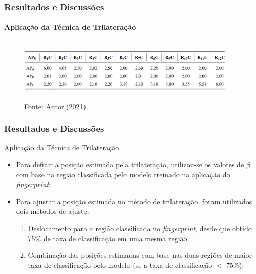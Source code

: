 \documentclass[xcolor={dvipsnames,svgnames,table}]{beamer}
\begin{document}
	\begin{frame}
		\frametitle{Resultados e Discussões}
		\framesubtitle{Aplicação da Técnica de Trilateração}
		\begin{figure}
			\caption*{Tabela 3: Valores do fator de perda de percurso ($\beta$) em cada centro de região para cada AP}
			\vspace{-5pt}
			\centering
			\includegraphics[width=10.5cm, height=3cm]{imgs/betas.PNG}
			\vspace{-5pt}
			\caption*{\tiny{Fonte: Autor (2021).}}
		\end{figure}
	\end{frame}

	\begin{frame}
		\frametitle{Resultados e Discussões}
		\begin{block}{Aplicação da Técnica de Trilateração}
			\begin{itemize}[label=\textcolor{black}{\textbullet}, left=5pt]
				\justifying
				\item Para definir a posição estimada pela trilateração, utilizou-se os valores de $\beta$ com base na região classificada pelo modelo treinado na aplicação do \textit{fingerprint};
				\item Para ajustar a posição estimada no método de trilateração, foram utilizados dois métodos de ajuste:
				\begin{enumerate}[label=\arabic*.]
					\item Deslocamento para a região classificada no \textit{fingerprint}, desde que obtido 75\% de taxa de classificação em uma mesma região;
					\item Combinação das posições estimadas com base nas duas regiões de maior taxa de classificação pelo modelo (se a taxa de classificação $<$ 75\%);%
				\end{enumerate}
			\end{itemize}
		\end{block}
	\end{frame}
\end{document}
